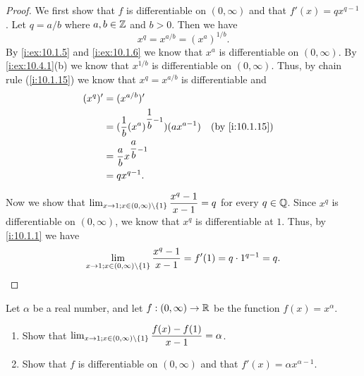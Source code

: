 \begin{proof}
  We first show that \(f\) is differentiable on \((0, \infty)\) and that \(f'(x) = q x^{q - 1}\).
  Let \(q = a / b\) where \(a, b \in \mathbb{Z}\) and \(b > 0\).
  Then we have
  \[
    x^q = x^{a / b} = (x^a)^{1 / b}.
  \]
  By \cref{i:ex:10.1.5} and \cref{i:ex:10.1.6} we know that \(x^a\) is differentiable on \((0, \infty)\).
  By \cref{i:ex:10.4.1}(b) we know that \(x^{1 / b}\) is differentiable on \((0, \infty)\).
  Thus, by chain rule (\cref{i:10.1.15}) we know that \(x^q = x^{a / b}\) is differentiable and
  \begin{align*}
    (x^q)' & = (x^{a / b})'                                                              \\
           & = (\dfrac{1}{b} (x^a)^{\dfrac{1}{b} - 1}) (a x^{a - 1}) &  & \by{i:10.1.15} \\
           & = \dfrac{a}{b} x^{\dfrac{a}{b} - 1}                                         \\
           & = q x^{q - 1}.
  \end{align*}

  Now we show that \(\lim_{x \to 1 ; x \in (0, \infty) \setminus \left\lbrace1\right\rbrace} \dfrac{x^q - 1}{x - 1} = q\) for every \(q \in \mathbb{Q}\).
  Since \(x^q\) is differentiable on \((0, \infty)\), we know that \(x^q\) is differentiable at \(1\).
  Thus, by \cref{i:10.1.1} we have
  \[
    \lim_{x \to 1 ; x \in (0, \infty) \setminus \left\lbrace1\right\rbrace} \dfrac{x^q - 1}{x - 1} = f'(1) = q \cdot 1^{q - 1} = q.
  \]
\end{proof}

\begin{ex}\label{i:ex:10.4.3}
  Let \(\alpha\) be a real number, and let \(f : (0, \infty) \to \mathbb{R}\) be the function \(f(x) = x^{\alpha}\).
  \begin{enumerate}
    \item Show that \(\lim_{x \to 1 ; x \in (0, \infty) \setminus \left\lbrace1\right\rbrace} \dfrac{f(x) - f(1)}{x - 1} = \alpha\).
    \item Show that \(f\) is differentiable on \((0, \infty)\) and that \(f'(x) = \alpha x^{\alpha - 1}\).
  \end{enumerate}
\end{ex}

